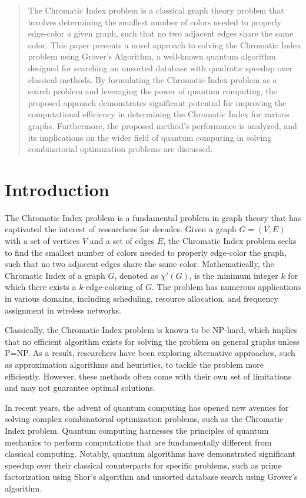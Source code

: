 \begin{abstract}
The Chromatic Index problem is a classical graph theory problem that involves determining the smallest number of colors needed to properly edge-color a given graph, such that no two adjacent edges share the same color. This paper presents a novel approach to solving the Chromatic Index problem using Grover's Algorithm, a well-known quantum algorithm designed for searching an unsorted database with quadratic speedup over classical methods. By formulating the Chromatic Index problem as a search problem and leveraging the power of quantum computing, the proposed approach demonstrates significant potential for improving the computational efficiency in determining the Chromatic Index for various graphs. Furthermore, the proposed method's performance is analyzed, and its implications on the wider field of quantum computing in solving combinatorial optimization problems are discussed.

\end{abstract}

\section{Introduction}

The Chromatic Index problem is a fundamental problem in graph theory that has captivated the interest of researchers for decades. Given a graph $G = (V, E)$ with a set of vertices $V$ and a set of edges $E$, the Chromatic Index problem seeks to find the smallest number of colors needed to properly edge-color the graph, such that no two adjacent edges share the same color. Mathematically, the Chromatic Index of a graph $G$, denoted as $\chi'(G)$, is the minimum integer $k$ for which there exists a $k$-edge-coloring of $G$. The problem has numerous applications in various domains, including scheduling, resource allocation, and frequency assignment in wireless networks.

Classically, the Chromatic Index problem is known to be NP-hard, which implies that no efficient algorithm exists for solving the problem on general graphs unless P=NP. As a result, researchers have been exploring alternative approaches, such as approximation algorithms and heuristics, to tackle the problem more efficiently. However, these methods often come with their own set of limitations and may not guarantee optimal solutions.

In recent years, the advent of quantum computing has opened new avenues for solving complex combinatorial optimization problems, such as the Chromatic Index problem. Quantum computing harnesses the principles of quantum mechanics to perform computations that are fundamentally different from classical computing. Notably, quantum algorithms have demonstrated significant speedup over their classical counterparts for specific problems, such as prime factorization using Shor's algorithm and unsorted database search using Grover's algorithm.

